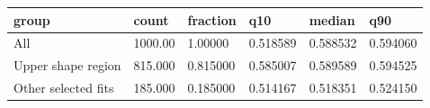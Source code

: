 \begin{tabular}{llllll}
\toprule
group & count & fraction & q10 & median & q90 \\
\midrule
All & 1000.00 & 1.00000 & 0.518589 & 0.588532 & 0.594060 \\
Upper shape region & 815.000 & 0.815000 & 0.585007 & 0.589589 & 0.594525 \\
Other selected fits & 185.000 & 0.185000 & 0.514167 & 0.518351 & 0.524150 \\
\bottomrule
\end{tabular}
